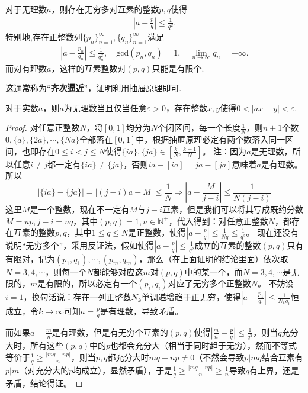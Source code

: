 \documentclass[../../main.tex]{subfiles}%
\begin{document}
\begin{theorem}[Dirichlet逼近定理]\label{theorem:Dirichlet逼近定理}
对于无理数\(a\)，则存在无穷多对互素的整数\(p,q\)使得
\begin{align*}
\left|a - \frac{p}{q}\right|\leqslant \frac{1}{q^2}.
\end{align*}
特别地,存在正整数列$\{p_n\}_{n=1}^{\infty},\{q_n\}_{n=1}^{\infty}$满足
\begin{align*}
\left| a-\frac{p_n}{q_n} \right|\leqslant \frac{1}{q_{n}^{2}},\quad \mathrm{gcd}\left( p_n,q_n \right) =1,\quad \underset{n\rightarrow \infty}{\lim}q_n=+\infty .
\end{align*}
而对有理数\(a\)，这样的互素整数对\((p,q)\)只能是有限个.
\end{theorem}
\begin{note}
这通常称为“\textbf{齐次逼近}”，证明利用抽屉原理即可.
\end{note}

\begin{corollary}
对于实数\(a\)，则\(a\)为无理数当且仅当任意\(\varepsilon>0\)，存在整数\(x,y\)使得\(0 < |ax - y| < \varepsilon\).
\end{corollary}
\begin{proof}
对任意正整数\(N\)，将\([0,1]\)均分为\(N\)个闭区间，每一个长度\(\frac{1}{N}\)，则\(n + 1\)个数\(0,\{a\},\{2a\},\cdots,\{Na\}\)全部落在\([0,1]\)中，根据抽屉原理必定有两个数落入同一区间，也即存在\(0\leqslant  i < j\leqslant  N\)使得\(\{ia\},\{ja\}\in\left[\frac{k}{N},\frac{k + 1}{N}\right]\)。
注：因为\(a\)是无理数，所以任意\(i\neq j\)都一定有\(\{ia\}\neq\{ja\}\)，否则\(ia - [ia]=ja - [ja]\)意味着\(a\)是有理数。
所以
\[|\{ia\} - \{ja\}|=|(j - i)a - M|\leqslant \frac{1}{N}\Rightarrow\left|a - \frac{M}{j - i}\right|\leqslant \frac{1}{N(j - i)}\]
这里\(M\)是一个整数，现在不一定有\(M\)与\(j - i\)互素，但是我们可以将其写成既约分数\(M = up,j - i = uq\)，其中\((p,q)=1,u\in\mathbb{N}^+\)，代入得到：对任意正整数\(N\)，都存在互素的整数\(p,q\)，其中\(1\leqslant  q\leqslant  N\)是正整数，使得\(\left|a - \frac{p}{q}\right|\leqslant \frac{1}{Nq}\leqslant \frac{1}{q^2}\)。
现在还没有说明“无穷多个”，采用反证法，假如使得\(\left|a - \frac{p}{q}\right|\leqslant \frac{1}{q^2}\)成立的互素的整数\((p,q)\)只有有限对，记为\((p_1,q_1),\cdots,(p_m,q_m)\)，那么（在上面证明的结论里面）依次取\(N = 3,4,\cdots\)，则每一个\(N\)都能够对应这\(m\)对\((p,q)\)中的某一个，而\(N = 3,4,\cdots\)是无限的，\(m\)是有限的，所以必定有一个\((p_i,q_i)\)对应了无穷多个正整数\(N\)。
不妨设\(i = 1\)，换句话说：存在一列正整数\(N_k\)单调递增趋于正无穷，使得\(\left|a - \frac{p_1}{q_1}\right|\leqslant \frac{1}{N_kq_1}\)恒成立，令\(k\to\infty\)可知\(a = \frac{p}{q}\)是有理数，导致矛盾。

而如果\(a=\frac{m}{n}\)是有理数，但是有无穷个互素的\((p,q)\)使得\(\left|\frac{m}{n}-\frac{p}{q}\right|\leqslant \frac{1}{q^2}\)，则当\(q\)充分大时，所有这些\((p,q)\)中的\(p\)也都会充分大（相当于同时趋于无穷），然而不等式等价于\(\frac{1}{q}\geqslant \frac{|mq - np|}{n}\)，则当\(p,q\)都充分大时\(mq - np\neq0\)（不然会导致\(p|mq\)结合互素有\(p|m\)（对充分大的\(p\)均成立），显然矛盾），于是\(\frac{1}{q}\geqslant \frac{|mq - np|}{n}\geqslant \frac{1}{n}\)导致\(q\)有上界，还是矛盾，结论得证。
\end{proof}
\end{document}
